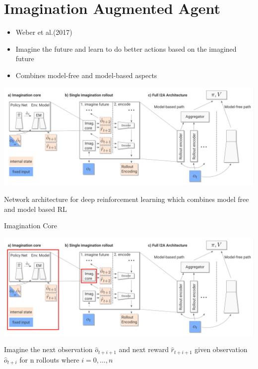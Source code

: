 \section{Imagination Augmented Agent}
\label{sec:performance_optimize}




\begin{itemize}

	\item Weber et al.(2017)
    \item Imagine the future and learn to do better actions based on the imagined future
    \item Combines model-free and model-based aspects

\end{itemize}


\includegraphics[width=\columnwidth]{./Images/i2a_architecture.png}%

Network architecture for deep reinforcement learning which combines model free and model based RL



Imagination Core

\includegraphics[width=\columnwidth]{./Images/i2a_all_imagination_core.png}%

Imagine the next observation $\hat{o}_{t+i+1}$ and next reward $\hat{r}_{t+i+1}$ given observation $\hat{o}_{t+i}$ for n rollouts where $i = 0, ..., n$

